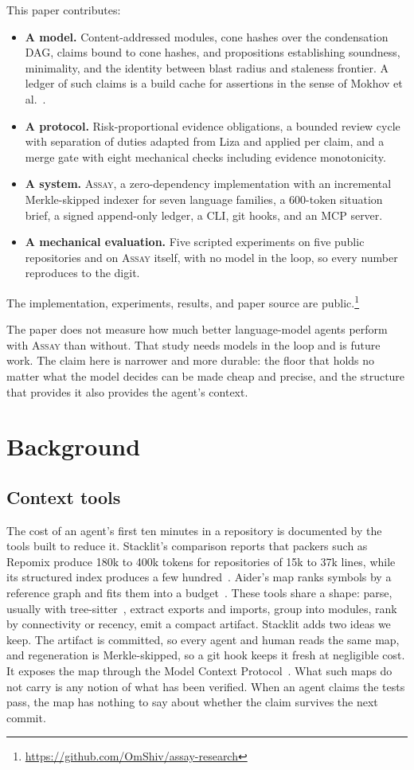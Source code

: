 \documentclass[conference]{IEEEtran}
\newcommand{\assay}{\textsc{Assay}}
\begin{document}
This paper contributes:
\begin{itemize}
  \item \textbf{A model.} Content-addressed modules, cone hashes over the condensation DAG, claims bound to cone hashes, and propositions establishing soundness, minimality, and the identity between blast radius and staleness frontier. A ledger of such claims is a build cache for assertions in the sense of Mokhov et al.~\citep{mokhov2018build}.
  \item \textbf{A protocol.} Risk-proportional evidence obligations, a bounded review cycle with separation of duties adapted from Liza and applied per claim, and a merge gate with eight mechanical checks including evidence monotonicity.
  \item \textbf{A system.} \assay{}, a zero-dependency implementation with an incremental Merkle-skipped indexer for seven language families, a 600-token situation brief, a signed append-only ledger, a CLI, git hooks, and an MCP server.
  \item \textbf{A mechanical evaluation.} Five scripted experiments on five public repositories and on \assay{} itself, with no model in the loop, so every number reproduces to the digit.
\end{itemize}
The implementation, experiments, results, and paper source are public.\footnote{\url{https://github.com/OmShiv/assay-research}}

The paper does not measure how much better language-model agents perform with \assay{} than without. That study needs models in the loop and is future work. The claim here is narrower and more durable: the floor that holds no matter what the model decides can be made cheap and precise, and the structure that provides it also provides the agent's context.

\section{Background}

\subsection{Context tools}

The cost of an agent's first ten minutes in a repository is documented by the tools built to reduce it. Stacklit's comparison reports that packers such as Repomix produce 180k to 400k tokens for repositories of 15k to 37k lines, while its structured index produces a few hundred~\citep{stacklit}. Aider's map ranks symbols by a reference graph and fits them into a budget~\citep{aider}. These tools share a shape: parse, usually with tree-sitter~\citep{treesitter}, extract exports and imports, group into modules, rank by connectivity or recency, emit a compact artifact. Stacklit adds two ideas we keep. The artifact is committed, so every agent and human reads the same map, and regeneration is Merkle-skipped, so a git hook keeps it fresh at negligible cost. It exposes the map through the Model Context Protocol~\citep{mcp}. What such maps do not carry is any notion of what has been verified. When an agent claims the tests pass, the map has nothing to say about whether the claim survives the next commit.
\end{document}
